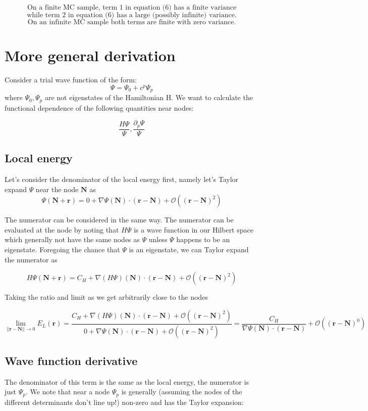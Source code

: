 \documentclass{article}
\begin{document}
$$\boxed{\text{On a finite MC sample, term 1 in equation (6) has a finite variance}}$$
$$\boxed{\text{while term 2 in equation (6) has a large (possibly infinite) variance.}} $$
$$\boxed{\text{On an infinite MC sample both terms are finite with zero variance.}}$$


\section{More general derivation}
Consider a trial wave function of the form:
$$\Psi = \Psi_0 + c^p \Psi_p$$
where $\Psi_0, \Psi_p$ are not eigenstates of the Hamiltonian H. We want to calculate the functional dependence of the following quantities near nodes:

$$\frac{H\Psi}{\Psi}, \frac{\partial_p \Psi}{\Psi}$$

\subsection{Local energy}
Let's consider the denominator of the local energy first, namely let's Taylor expand $\Psi$ near the node $\textbf{N}$ as $$\Psi(\textbf{N} + \textbf{r}) = 0  + \nabla \Psi(\textbf{N})\cdot (\textbf{r} - \textbf{N}) + \mathcal{O}((\textbf{r}-\textbf{N})^2)$$

The numerator can be considered in the same way. The numerator can be evaluated at the node by noting that $H\Psi$ is a wave function in our Hilbert space which generally not have the same nodes as $\Psi$ unless $\Psi$ happens to be an eigenstate. Foregoing the chance that $\Psi$ is an eigenstate, we can Taylor expand the numerator as

$$H\Psi(\textbf{N}+\textbf{r}) = C_H  + \nabla (H\Psi)(\textbf{N})\cdot (\textbf{r} - \textbf{N}) + \mathcal{O}((\textbf{r}-\textbf{N})^2)$$

Taking the ratio and limit as we get arbitrarily close to the nodes

$$\lim_{||\textbf{r}-\textbf{N}||\rightarrow 0} E_L(\textbf{r}) =\frac{C_H  + \nabla (H\Psi)(\textbf{N})\cdot (\textbf{r} - \textbf{N}) + \mathcal{O}((\textbf{r}-\textbf{N})^2)}{0  + \nabla \Psi(\textbf{N})\cdot (\textbf{r} - \textbf{N}) + \mathcal{O}((\textbf{r}-\textbf{N})^2)} = \frac{C_H}{\nabla \Psi(\textbf{N})\cdot (\textbf{r} - \textbf{N})} + \mathcal{O}((\textbf{r}-\textbf{N})^0) $$

\subsection{Wave function derivative}
The denominator of this term is the same as the local energy, the numerator is just $\Psi_p$. We note that near a node $\Psi_p$ is generally (assuming the nodes of the different determinants don't line up!) non-zero and has the Taylor expansion:
\end{document}
